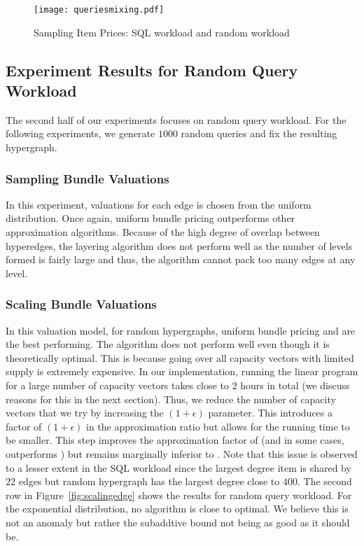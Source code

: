 \begin{figure}[!t]
	\centering
	\texttt{[image: queriesmixing.pdf]}
	\caption{Sampling Item Prices: SQL workload and random workload} \label{fig:mixing}
\end{figure}  

\subsection{Experiment Results for Random Query Workload}


The second half of our experiments focuses on random query workload. For the following experiments, we generate $1000$ random queries and fix the resulting hypergraph. 

\subsubsection{Sampling Bundle Valuations}

In this experiment, valuations for each edge is chosen from the uniform distribution. Once again, uniform bundle pricing outperforms other approximation algorithms. Because of the high degree of overlap between hyperedges, the layering algorithm does not perform well as the number of levels formed is fairly large and thus, the algorithm cannot pack too many edges at any level.

\subsubsection{Scaling Bundle Valuations} In this valuation model, for random hypergraphs, uniform bundle pricing and \lpip are the best performing. The \cip algorithm does not perform well even though it is theoretically optimal. This is because going over all capacity vectors with limited supply is extremely expensive. In our implementation, running the linear program for a large number of capacity vectors takes close to $2$ hours in total (we discuss reasons for this in the next section). Thus, we reduce the number of capacity vectors that we try by increasing the $(1+\epsilon)$ parameter. This introduces a factor of $(1+\epsilon)$ in the approximation ratio but allows for the running time to be smaller. This step improves the approximation factor of \cip (and in some cases, outperforms \lpip) but remains marginally inferior to \lpip . Note that this issue is observed to a lesser extent in the SQL workload since the largest degree item is shared by $22$ edges but random hypergraph has the largest degree close to $400$. The second row in Figure~\ref{fig:scalingedge} shows the results for random query workload. For the exponential distribution, no algorithm is close to optimal. We believe this is not an anomaly but rather the subaddtive bound not being as good as it should be.

